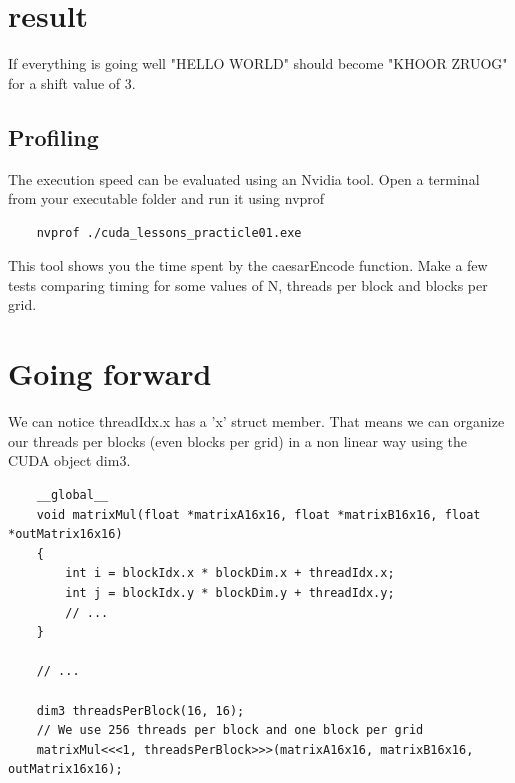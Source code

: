 \documentclass{article}
\begin{document}
\section{result}
If everything is going well "HELLO WORLD" should become "KHOOR ZRUOG" for a shift value of 3.

\subsection{Profiling}
The execution speed can be evaluated using an Nvidia tool. Open a terminal from your executable folder and run it using nvprof
\begin{lstlisting}
	nvprof ./cuda_lessons_practicle01.exe
\end{lstlisting}
This tool shows you the time spent by the caesarEncode function. Make a few tests comparing timing for some values of N, threads per block and blocks per grid.

\section{Going forward}
We can notice threadIdx.x has a 'x' struct member. That means we can organize our threads per blocks (even blocks per grid) in a non linear way using the CUDA object dim3.
\begin{lstlisting}
	__global__
	void matrixMul(float *matrixA16x16, float *matrixB16x16, float *outMatrix16x16)
	{
		int i = blockIdx.x * blockDim.x + threadIdx.x;
		int j = blockIdx.y * blockDim.y + threadIdx.y;
		// ...
	}

	// ...

	dim3 threadsPerBlock(16, 16);
	// We use 256 threads per block and one block per grid
	matrixMul<<<1, threadsPerBlock>>>(matrixA16x16, matrixB16x16, outMatrix16x16);
\end{lstlisting}
\end{document}
